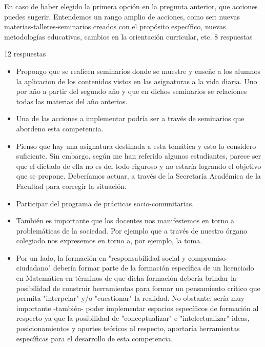 \documentclass[a4paper,10pt,BCOR10mm,oneside,headsepline]{scrbook}
\begin{document}
\begin{subappendices}
En caso de haber elegido la primera opción en la pregunta anterior, que acciones puedes sugerir. Entendemos un rango amplio de acciones, como ser: nuevas materias-talleres-seminarios creados con el propósito específico, nuevas metodologías educativas, cambios en la orientación curricular, etc. 8 respuestas

 12 respuestas

 \begin{itemize}
 \item Propongo que se realicen seminarios donde se muestre y enseñe a los alumnos la aplicacion de los contenidos vistos en las asignaturas a la vida diaria. Uno por año a partir del segundo año y que en dichos seminarios se relaciones todas las materias del año anterios.

  \item Una de las acciones a implementar podría ser a través de seminarios que abordeno esta competencia. 
  
 \item Pienso que hay una asignatura destinada a esta temática y esto lo considero suficiente. Sin embargo,  según me han referido algunos estudiantes,   parece ser que el dictado de ella no es del todo riguroso y no estaría logrando el objetivo que se propone. Deberíamos actuar, a través de la Secretaría Académica de la Facultad para corregir la situación.  

 \item  Participar del programa de prácticas socio-comunitarias.

 \item También es importante que los docentes nos manifestemos en torno a problemáticas de la sociedad. Por ejemplo que a través de nuestro órgano colegiado nos expresemos en torno a, por ejemplo, la toma.  
 
 \item Por un lado, la formación en "responsabilidad social y compromiso ciudadano" debería formar parte de la formación específica de un licenciado en Matemática en términos de que dicha formación debería brindar la posibilidad de construir herramientas para formar un pensamiento crítico que permita "interpelar" y/o "cuestionar" la realidad. No obstante, sería muy importante -también- poder implementar espacios específicos de formación al respecto ya que la posibilidad de "conceptualizar" e "intelectualizar" ideas, posicionamientos y aportes teóricos al respecto, aportaría herramientas específicas para el desarrollo de esta competencia.
 

\end{itemize}
\end{subappendices}
\end{document}
